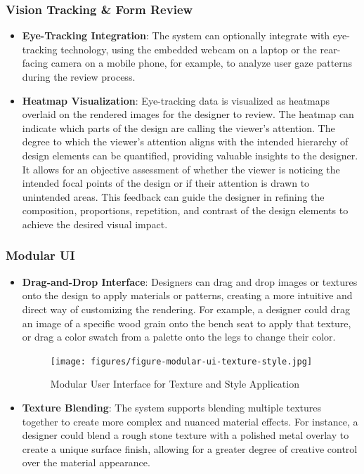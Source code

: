 \documentclass[12pt]{article}
\begin{document}
\subsubsection{Vision Tracking \& Form Review}
\begin{itemize}
\item \textbf{Eye-Tracking Integration}: The system can optionally integrate with eye-tracking technology, using the embedded webcam on a laptop or the rear-facing camera on a mobile phone, for example, to analyze user gaze patterns during the review process.
\item \textbf{Heatmap Visualization}: Eye-tracking data is visualized as heatmaps overlaid on the rendered images for the designer to review. The heatmap can indicate which parts of the design are calling the viewer's attention. The degree to which the viewer's attention aligns with the intended hierarchy of design elements can be quantified, providing valuable insights to the designer. It allows for an objective assessment of whether the viewer is noticing the intended focal points of the design or if their attention is drawn to unintended areas. This feedback can guide the designer in refining the composition, proportions, repetition, and contrast of the design elements to achieve the desired visual impact.
\end{itemize}

\subsubsection{Modular UI}
\begin{itemize}
\item \textbf{Drag-and-Drop Interface}: Designers can drag and drop images or textures onto the design to apply materials or patterns, creating a more intuitive and direct way of customizing the rendering. For example, a designer could drag an image of a specific wood grain onto the bench seat to apply that texture, or drag a color swatch from a palette onto the legs to change their color.

\begin{figure}[h]
    \centering
    \texttt{[image: figures/figure-modular-ui-texture-style.jpg]}
    \caption{Modular User Interface for Texture and Style Application}
    \label{fig:modular-ui-texture-style}
\end{figure}

\item \textbf{Texture Blending}: The system supports blending multiple textures together to create more complex and nuanced material effects. For instance, a designer could blend a rough stone texture with a polished metal overlay to create a unique surface finish, allowing for a greater degree of creative control over the material appearance.
\end{itemize}
\end{document}
